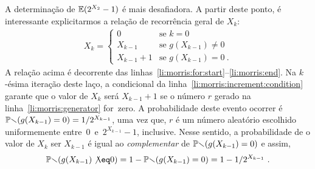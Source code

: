 A determinação de $\mathbb{E}(2^{X_2} - 1)$ é mais desafiadora. A partir deste ponto, é interessante explicitarmos a relação
de recorrência geral de $X_k$:
\begin{align}
  \label{morris:rec:xk}
X_k = \begin{cases} 
  0                 & \mbox{se } k = 0 \\[2mm]
  X_{k-1}           & \mbox{se } g(X_{k-1}) \neq 0 \\[2mm]
  X_{k-1} + 1       & \mbox{se } g(X_{k-1}) =  0\ .  
\end{cases}
\end{align}
A relação acima é decorrente das linhas~\ref{li:morris:for:start}--\ref{li:morris:end}. Na $k$-ésima iteração deste 
laço, a condicional da linha~\ref{li:morris:increment:condition} garante que o valor de $X_k$ será $X_{k-1} + 1$ se o 
número $r$ gerado na linha~\ref{li:morris:generator} for~zero. A probabilidade deste evento ocorrer é 
$\mathbb{Pr}(g(X_{k-1}) = 0) = 1/2^{X_{k-1}}$, uma vez que, $r$ é um número aleatório escolhido uniformemente 
entre~$0$~e~$2^{X_{k-1}} - 1$, inclusive. Nesse sentido, a probabilidade de o valor de $X_k$ ser $X_{k - 1}$ é igual ao 
\textit{complementar} de $\mathbb{Pr}(g(X_{k-1}) = 0)$ e assim, 
\[\Pbb(g(X_{k-1}) \not\eq 0) = 1 - \Pbb(g(X_{k-1}) = 0) = 1 - 1/2^{X_{k-1}} \ . \]

